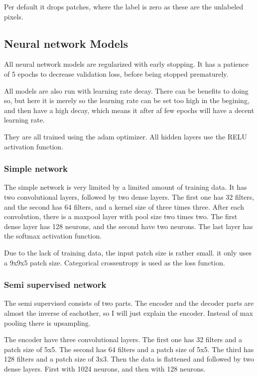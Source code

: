 Per default it drops patches, where the label is zero as these are the unlabeled pixels.

\subsection{Neural network Models} %
\label{sub:models}
All neural network models are regularized with early stopping.
It has a patience of 5 epochs to decrease validation loss, before being stopped prematurely.

All models are also run with learning rate decay.
There can be benefits to doing so, but here it is merely so the learning rate can be set too high in the begining, and then have a high decay, which means it after af few epochs will have a decent learning rate.

They are all trained using the adam optimizer.
All hidden layers use the RELU activation function.
\subsubsection{Simple network} %
\label{sub:simple_network}
The simple network is very limited by a limited amount of training data.
It has two convolutional layers, followed by two dense layers.
The first one has 32 filters, and the second has 64 filters, and a kernel size of three times three.
After each convolution, there is a maxpool layer with pool size two times two.
The first dense layer has 128 neurons, and the second have two neurons.
The last layer has the softmax activation function.

Due to the lack of training data, the input patch size is rather small.
it only uses a 9x9x5 patch size.
Categorical crossentropy is used as the loss function.


\subsubsection{Semi supervised network} %
\label{sub:semi_supervised_network}
The semi supervised consists of two parts.
The encoder and the decoder parts are almost the inverse of eachother, so I will just explain the encoder.
Instead of max pooling there is upsampling.

The encoder have three convolutional layers.
The first one has 32 filters and a patch size of 5x5.
The second has 64 filters and a patch size of 5x5.
The third has 128 filters and a patch size of 3x3.
Then the data is flattened and followed by two dense layers.
First with 1024 neurons, and then with 128 neurons.

